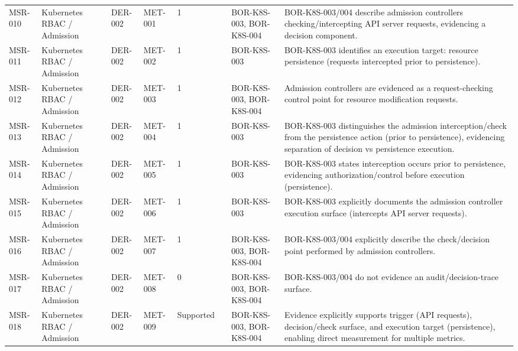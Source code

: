 \documentclass{article}
\begin{document}
\begin{longtable}{@{}p{}p{}p{}p{}p{}p{}p{}p{}@{}}
MSR-010 & Kubernetes RBAC / Admission & DER-002 & MET-001 & 1 &  & BOR-K8S-003, BOR-K8S-004 & BOR-K8S-003/004 describe admission controllers checking/intercepting API server requests, evidencing a decision component.\\
MSR-011 & Kubernetes RBAC / Admission & DER-002 & MET-002 & 1 &  & BOR-K8S-003 & BOR-K8S-003 identifies an execution target: resource persistence (requests intercepted prior to persistence).\\
MSR-012 & Kubernetes RBAC / Admission & DER-002 & MET-003 & 1 &  & BOR-K8S-003, BOR-K8S-004 & Admission controllers are evidenced as a request-checking control point for resource modification requests.\\
MSR-013 & Kubernetes RBAC / Admission & DER-002 & MET-004 & 1 &  & BOR-K8S-003 & BOR-K8S-003 distinguishes the admission interception/check from the persistence action (prior to persistence), evidencing separation of decision vs persistence execution.\\
MSR-014 & Kubernetes RBAC / Admission & DER-002 & MET-005 & 1 &  & BOR-K8S-003 & BOR-K8S-003 states interception occurs prior to persistence, evidencing authorization/control before execution (persistence).\\
MSR-015 & Kubernetes RBAC / Admission & DER-002 & MET-006 & 1 &  & BOR-K8S-003 & BOR-K8S-003 explicitly documents the admission controller execution surface (intercepts API server requests).\\
MSR-016 & Kubernetes RBAC / Admission & DER-002 & MET-007 & 1 &  & BOR-K8S-003, BOR-K8S-004 & BOR-K8S-003/004 explicitly describe the check/decision point performed by admission controllers.\\
MSR-017 & Kubernetes RBAC / Admission & DER-002 & MET-008 & 0 &  & BOR-K8S-003, BOR-K8S-004 & BOR-K8S-003/004 do not evidence an audit/decision-trace surface.\\
MSR-018 & Kubernetes RBAC / Admission & DER-002 & MET-009 & Supported &  & BOR-K8S-003, BOR-K8S-004 & Evidence explicitly supports trigger (API requests), decision/check surface, and execution target (persistence), enabling direct measurement for multiple metrics.\\


\end{longtable}
\end{document}
